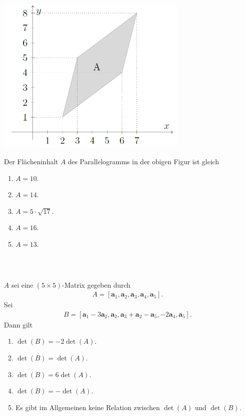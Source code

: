 \subsection*{}
\begin{center}
	\includegraphics[width=0.7\textwidth]{pictures/aufgabe2_7}
\end{center}
Der Flächeninhalt $ A $ des Parallelogramms in der obigen Figur ist gleich
\renewcommand{\labelenumi}{(\alph{enumi})}
\begin{enumerate}
\item 
$ A = 10 $.
\item
$ A = 14 $.
\item
$ A = 5 \cdot  \sqrt{17} $.
\item
$ A = 16 $.
\item
$ A = 13 $.
\end{enumerate}
\ \\
\subsection*{}
$ A $ sei eine $ (5 \times 5) $-Matrix gegeben durch
\begin{align*}
	A
	=
	\left[
	\textbf{a}_1,
	\textbf{a}_2,
	\textbf{a}_3,
	\textbf{a}_4,
	\textbf{a}_5
	\right].
\end{align*}
Sei 
\begin{align*}
	B =
	\left[
	\textbf{a}_1 - 3 \textbf{a}_2,
	\textbf{a}_2,
	\textbf{a}_3 + \textbf{a}_2 - \textbf{a}_5,
	-2 \textbf{a}_4,
	\textbf{a}_5
	\right].
\end{align*}
Dann gilt
\renewcommand{\labelenumi}{(\alph{enumi})}
\begin{enumerate}
	\item 
	$ \det(B) = -2 \det(A) $.
	\item
	$ \det(B) = \det(A) $.
	\item
	$ \det(B) = 6 \det(A) $.
	\item
	$ \det(B) = -\det(A) $.
	\item
	Es gibt im Allgemeinen keine Relation zwischen $ \det(A) $ und $ \det(B) $.
\end{enumerate}
\ \\
